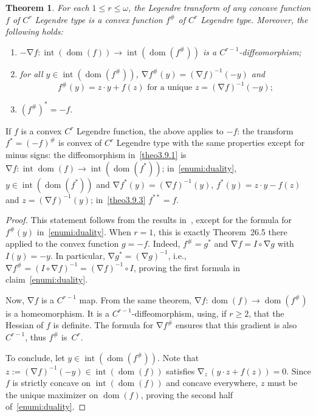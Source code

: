 \documentclass[10pt]{amsart}
\newtheorem{theo}{Theorem}[section]
\theoremstyle{definition}\newtheorem{defi}[theo]{Definition}\newtheorem{rema}[theo]{Remark}\newtheorem{exam}[theo]{Example}\newtheorem{exem}[theo]{Example}\newtheorem{nota}[theo]{Notation}
\theoremstyle{plain}
\theoremstyle{plain}
\newcommand\dom{\operatorname{dom}}
\newcommand\inter{\operatorname{int}}
\newcommand{\grad}{\operatorname{\nabla}}
\newcounter{In}
\newcommand*\8{\infty}
\newcommand*{\romanenumi}{\renewcommand*{\theenumi}{\roman{enumi}}}
\begin{document}
\begin{theo}\label{theo-Legendre}
For each $1\leq r\leq\omega$, the Legendre transform of any concave function $f$ of $C^r$ Legendre type is a convex function $f^\#$ of $C^r$ Legendre type. Moreover, the following holds:
\begin{enumerate}\romanenumi
\item\label{theo3.9.1} $ -\grad f:\inter(\dom(f))\to\inter(\dom(f^\#))$ is a $C^{r-1}$-diffeomorphism;
\item\label{enumi:duality}
for all $y\in\inter(\dom(f^\#))$, $\grad f^\# (y) = (\grad f)^{-1}(-y)$ and
\[
f^\#(y)=z\cdot y+f(z) \text{ for a unique }z=(\grad f)^{-1}(-y);
\]
\item\label{theo3.9.3} $(f^{\#})^*=-f$.
\end{enumerate}
\end{theo}


If $f$ is a convex $C^r$ Legendre function, the above applies to $-f$: the transform $f^*=(-f)^\#$ is convex of $C^r$ Legendre type with the same properties except for minus signs: the diffeomorphism in~\eqref{theo3.9.1} is $\grad f:\inter\dom(f)\to\inter(\dom(f^*))$; in~\eqref{enumi:duality}, $y\in\inter(\dom(f^*))$ and $\grad f^*(y)=(\grad f)^{-1}(y)$, $f^*(y)=z\cdot y-f(z)$ and $z=(\grad f)^{-1}(y)$; in~\eqref{theo3.9.3} $f^{**}=f$.


\begin{proof}
This statement follows from the results in~\cite[Chapitre~26]{Rockafellar-book}, except for the formula for $f^\#(y)$ in~\eqref{enumi:duality}. When $r=1$, this is exactly Theorem~26.5 there applied to the convex function $g=-f$. Indeed, $f^\#=g^*$ and $\grad f = I\circ\grad g$ with $I(y)=-y$. In particular, $\grad g^* = (\grad g)^{-1}$, i.e., $\grad f^\# = (I\circ\grad f)^{-1} =(\grad f)^{-1}\circ I$, proving the first formula in claim~\eqref{enumi:duality}.

Now, $\grad f$ is a $C^{r-1}$ map. From the same theorem, $\grad f:\dom(f)\to\dom(f^\#)$ is a homeomorphism. It is a $C^{r-1}$-diffeomorphism, using, if $r\geq2$, that the Hessian of $f$ is definite. The formula for $\grad f^\#$ ensures that this gradient is also $C^{r-1}$, thus $f^\#$ is~$C^r$.

To conclude, let $y\in\inter(\dom(f^\#))$. Note that $ z := (\grad f)^{-1}(-y)\in\inter(\dom(f))$ satisfies $\grad_{ z}\,(y\cdot z+f(z))=0$. Since $f$ is strictly concave on $\inter(\dom(f))$ and concave everywhere, $ z$ must be the unique maximizer on $\dom(f)$, proving the second half of~\eqref{enumi:duality}.
\end{proof}
\end{document}
